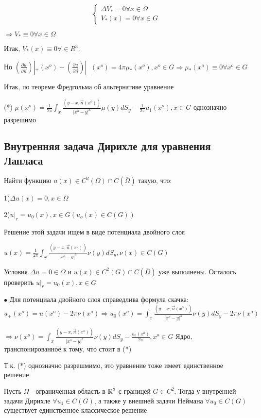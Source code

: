 \begin{equation}
 \begin{cases}
 \Delta V_* = 0 \forall x \in \Omega
  \\
  V_*(x) = 0 \forall x \in G
 \end{cases}
\end{equation}

$\Rightarrow V_* \equiv 0 \forall x \in \Omega$

Итак, $V_*(x) \equiv 0 \forall \in R^3$. 

Но $(\frac{\partial u}{\partial \vec{n}})|_+(x^o) - (\frac{\partial u}{\partial \vec{n}})|_-(x^o) = 4\pi \mu_*(x^o), x^o \in G \Rightarrow \mu_*(x^o) \equiv 0 \forall x^o \in G$

Итак, по теореме Фредгольма об альтернативе уравнение 

(*) $\mu(x^o) = \frac{1}{2\pi}\int_x \frac{(y - x, \vec{n}(x^o))}{|x^o - y|^3}\mu(y)dS_y - \frac{1}{2\pi}u_1(x^o), x \in G$ однозначно разрешимо

\subsection{Внутренняя задача Дирихле для уравнения Лапласа}

Найти функцию $u(x) \in C^2(\Omega) \cap C(\bar{\Omega})$ такую, что:

1)$\Delta u(x) = 0, x \in \Omega$

2)$u|_r = u_0(x), x \in G (u_o(x) \in C(G))$ 

Решение этой задачи ищем в виде потенциала двойного слоя 

$u(x) = \frac{1}{2\pi}\int_x \frac{(y - x, \vec{n}(x^o))}{|x^o - y|^3}\nu(y)dS_y, \nu(x) \in C(G)$

Условия $\Delta u = 0 \in \Omega$ и $u(x) \in C^2(G) \cap C(\bar{\Omega})$ уже выполнены. Осталось проверить $u|_r = u_0(x), x \in G$

$\bullet$ Для потенциала двойного слоя справедлива формула скачка: $u_+(x^o) = u(x^o) - 2\pi\nu(x^o) \Rightarrow u_0(x^o) = \int_x \frac{(y - x, \vec{n}(x^o))}{|x^o - y|^3}\nu(y)dS_y - 2\pi\nu(x^o)$

$\Rightarrow \nu(x^o) = \int_x \frac{(y - x, \vec{n}(x^o))}{|x^o - y|^3}\nu(y)dS_y - \frac{u_0(x^o)}{2\pi}, x^o \in G$ Ядро, транспонированное к тому, что стоит в (*) 

Т.к. (*) однозначно разрешмимо, это уравнение тоже имеет единственное решение

\begin{theorem} Пусть $\Omega$ - ограниченная область в $\mathbb{R}^3$ с границей $G \in C^2$. Тогда у внутренней задачи Дирихле $\forall u_1 \in C(G)$, а также у внешней задачи Неймана $\forall u_0 \in C(G)$ существует единственное классическое решение
\end{theorem} 



